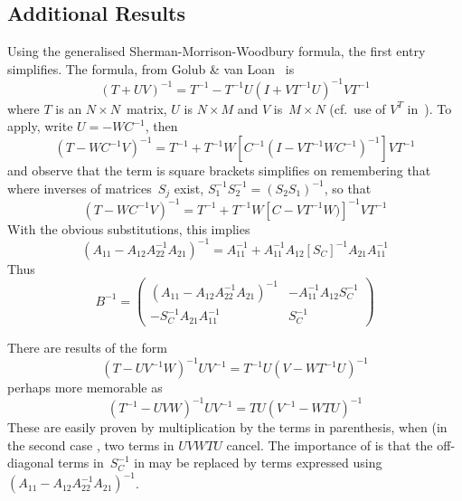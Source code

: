 \subsection{Additional Results}\label{sec:mthadd}
Using the generalised Sherman-Morrison-Woodbury formula, the first entry simplifies. The formula, from
Golub \& van Loan~\cite[Eq.\,(2.1.4)]{golubvanloan} is
\begin{equation}\label{eq:smw}
(T+UV)^{-1}=T^{-1}-T^{-1}U(I+VT^{-1}U)^{-1}VT^{-1}
\end{equation}
where $T$ is an $N \times N$~matrix, $U$ is $N \times M$ and $V$ is~$M \times N$
(cf.\ use of $V^T$ in~\cite{golubvanloan}).
To apply, write $U=-WC^{-1}$, then
\begin{equation}\label{eq:smwp}
(T-WC^{-1}V)^{-1}=T^{-1}+T^{-1}W \left[C^{-1}(I-VT^{-1}WC^{-1})^{-1}\right] VT^{-1}
\end{equation}
and observe that the term is square brackets simplifies on remembering that 
where inverses of matrices~$S_j$ exist, $S_1^{-1}S_2^{-1}= (S_2 S_1)^{-1}$, so that
\begin{equation}\label{eq:smwq}
(T-WC^{-1}V)^{-1}=T^{-1}+T^{-1}W \left[C-VT^{-1}W)\right]^{-1} VT^{-1}
\end{equation}
With the obvious substitutions, this implies
\begin{equation}\label{eq:smw2}
(A_{11}-A_{12}A_{22}^{-1}A_{21})^{-1}=A_{11}^{-1}+A_{11}^{-1}A_{12}[S_C]^{-1}A_{21}A_{11}^{-1}
\end{equation}
Thus 
\begin{equation}\label{eq:matrixth}
B^{-1}=
\begin{pmatrix}
(A_{11}-A_{12}A_{22}^{-1}A_{21})^{-1} & -A_{11}^{-1}A_{12}S_C^{-1} \\
-S_C^{-1}A_{21}A_{11}^{-1} & S_C^{-1}
\end{pmatrix}
\end{equation}


There are results of the form
\begin{equation}\label{eq:invprod}
(T-UV^{-1}W)^{-1}UV^{-1}=T^{-1}U(V-WT^{-1}U)^{-1}
\end{equation}
perhaps more memorable as
\begin{equation}\label{eq:invinvprod}
(T^{-1}-UVW)^{-1}UV^{-1}=TU(V^{-1}-WTU)^{-1}
\end{equation}
These are easily proven by multiplication by the terms in parenthesis, when (in the
second case , two terms in $UVWTU$  cancel. The importance
of  is that the off-diagonal terms in~$S_C^{-1}$ in 
may be replaced by terms expressed using $(A_{11}-A_{12}A_{22}^{-1}A_{21})^{-1}$.
